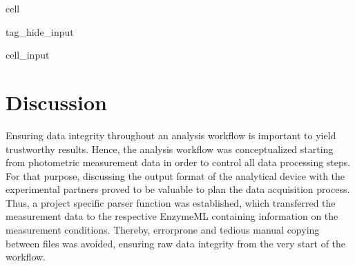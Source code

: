 \documentclass[letterpaper,12pt,english]{jupyterBook}
\begin{document}
\begin{sphinxuseclass}{cell}
\begin{sphinxuseclass}{tag_hide_input}
\begin{sphinxVerbatimInput}
\begin{sphinxuseclass}{cell_input}
\begin{sphinxVerbatim}[commandchars=\\\{\}]
  


  
 
\end{sphinxVerbatim}

\end{sphinxuseclass}\end{sphinxVerbatimInput}

\end{sphinxuseclass}
\end{sphinxuseclass}
\sphinxstepscope


\chapter{Discussion}
\label{\detokenize{discussion:discussion}}\label{\detokenize{discussion::doc}}
\sphinxAtStartPar
Ensuring data integrity throughout an analysis workflow is important to yield trustworthy results. Hence, the analysis workflow was conceptualized starting from photometric measurement data in order to control all data processing steps. For that purpose, discussing the output format of the analytical device with the experimental partners proved to be valuable to plan the data acquisition process. Thus, a project specific parser function was established, which transferred the measurement data to the respective EnzymeML containing information on the measurement conditions. Thereby, error\sphinxhyphen{}prone and tedious manual copying between files was avoided, ensuring raw data integrity from the very start of the workflow.
\end{document}
